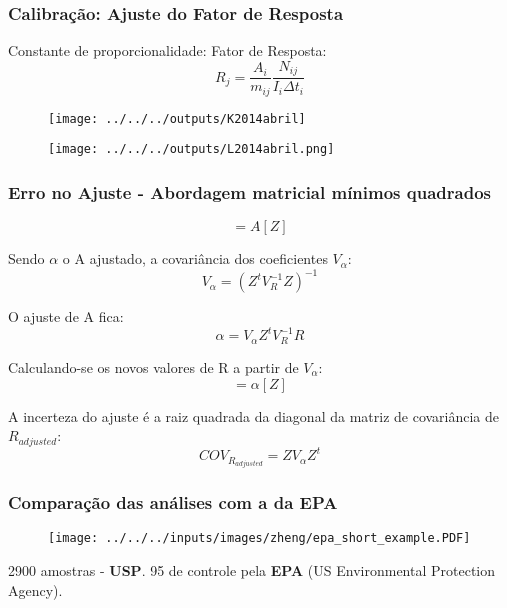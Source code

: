 \begin{frame}
  \frametitle{Calibração: Ajuste do Fator de Resposta}
  Constante de proporcionalidade: Fator de Resposta:
  \begin{equation}
    R_j = \frac{A_i}{m_{ij}} \frac{N_{ij}}{I_i \Delta t_i}
  \end{equation}
  \begin{figure}[H]
  \centering
    \begin{minipage}[b]{0.40\linewidth}
      \texttt{[image: ../../../outputs/K2014abril]}
    \end{minipage}
    \quad
    \begin{minipage}[b]{0.40\linewidth}
      \texttt{[image: ../../../outputs/L2014abril.png]}
    \end{minipage}
  \end{figure}
\end{frame}

\begin{frame}
  \frametitle{Erro no Ajuste - Abordagem matricial mínimos quadrados}
   \begin{equation}
     [R] = A[Z]
   \end{equation}
   
   Sendo $\alpha$ o A ajustado, a covariância dos coeficientes $V_{\alpha}$:
   \begin{equation}
     V_{\alpha} = (Z^t V_R^{-1} Z)^{-1}
   \end{equation}

   O ajuste de A fica:
   \begin{equation}
     \alpha = V_{\alpha} Z^t V_R^{-1} R
   \end{equation}

    Calculando-se os novos valores de R a partir de $V_{\alpha}$:
   \begin{equation}
     [R_{adjusted}] = \alpha[Z]
   \end{equation} 

    A incerteza do ajuste é a raiz quadrada da diagonal da matriz de covariância de $R_{adjusted}$:
   \begin{equation}
     COV_{R_{adjusted}} = Z V_{\alpha} Z^t
   \end{equation} 
\end{frame}

\begin{frame}
  \frametitle{Comparação das análises com a da \textbf{EPA}}
  \begin{figure}[H]
   \centering
    \texttt{[image: ../../../inputs/images/zheng/epa\_short\_example.PDF]}
  \end{figure}
  \begin{tiny}
    2900 amostras - \textbf{USP}. 
    95 de controle pela \textbf{EPA} (US Environmental Protection Agency).
  \end{tiny}
\end{frame}
